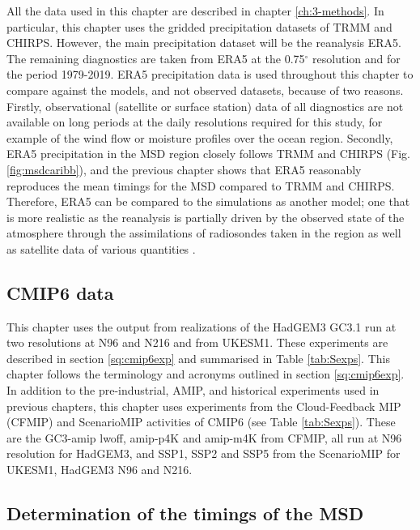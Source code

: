 All the data used in this chapter are described in chapter \ref{ch:3-methods}. In particular, this chapter uses the gridded precipitation datasets of TRMM and CHIRPS. However, the main precipitation dataset will be the reanalysis ERA5. The remaining diagnostics are taken from ERA5 at the 0.75$^\circ$ resolution and for the period 1979-2019. ERA5 precipitation data is used throughout this chapter to compare against the models, and not observed datasets, because of two reasons. Firstly, observational (satellite or surface station) data of all diagnostics are not available on long periods at the daily resolutions required for this study, for example of the wind flow or moisture profiles over the ocean region. Secondly, ERA5 precipitation in the MSD region closely follows TRMM and CHIRPS (Fig. \ref{fig:msdcaribb}), and the previous chapter shows that ERA5 reasonably reproduces the mean timings for the MSD compared to TRMM and CHIRPS. Therefore, ERA5 can be compared to the simulations as another model; one that is more realistic as the reanalysis is partially driven by the observed state of the atmosphere through the assimilations of radiosondes taken in the region as well as satellite data of various quantities \citep{era5hersbach}.

\subsection{CMIP6 data}\label{sq:ch6cmipdata}

This chapter uses the output from realizations of the HadGEM3 GC3.1 run at two resolutions at N96 and N216 and from UKESM1. These experiments are described in section \ref{sq:cmip6exp} and summarised in Table \ref{tab:Sexps}. This chapter follows the terminology and acronyms outlined in section \ref{sq:cmip6exp}. In addition to the pre-industrial, AMIP, and historical experiments used in previous chapters, this chapter uses experiments from the Cloud-Feedback MIP (CFMIP) \citep{webb2017} and ScenarioMIP \citep{o2016} activities of CMIP6 (see Table \ref{tab:Sexps}). These are the GC3-amip lwoff, amip-p4K and amip-m4K from CFMIP, all run at N96 resolution for HadGEM3, and SSP1, SSP2 and SSP5 from the ScenarioMIP for UKESM1, HadGEM3 N96 and N216.

\subsection{Determination of the timings of the MSD}

